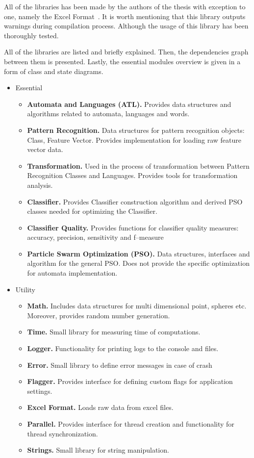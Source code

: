 \documentclass{mini}
\begin{document}
All of the libraries has been made by the authors of the thesis with exception to one, namely the Excel Format~\cite{excel_format}. It is worth mentioning that this library outputs warnings during compilation process. Although the usage of this library has been thoroughly tested.

All of the libraries are listed and briefly explained. Then, the dependencies graph between them is presented. Lastly, the essential modules overview is given in a form of class and state diagrams.

\begin{itemize}
    \item Essential
    \begin{itemize}
        \item {\bf Automata and Languages (ATL).} Provides data structures and algorithms related to automata, languages and words.
        \item {\bf Pattern Recognition.} Data structures for pattern recognition objects: Class, Feature Vector. Provides implementation for loading raw feature vector data.
        \item {\bf Transformation.} Used in the process of transformation between Pattern Recognition Classes and Languages. Provides tools for transformation analysis.
        \item {\bf Classifier.} Provides Classifier construction algorithm and derived PSO classes needed for optimizing the Classifier.
        \item {\bf Classifier Quality.} Provides functions for classifier quality measures: accuracy, precision, sensitivity and f--measure
        \item {\bf Particle Swarm Optimization (PSO).} Data structures, interfaces and algorithm for the general PSO. Does not provide the specific optimization for automata implementation.
    \end{itemize}

    \item Utility
    \begin{itemize}
        \item {\bf Math.} Includes data structures for multi dimensional point, spheres etc. Moreover, provides random number generation.
        \item {\bf Time.} Small library for measuring time of computations.
        \item {\bf Logger.} Functionality for printing logs to the console and files.
        \item {\bf Error.} Small library to define error messages in case of crash
        \item {\bf Flagger.} Provides interface for defining custom flags for application settings.
        \item {\bf Excel Format.} Loads raw data from excel files.
        \item {\bf Parallel.} Provides interface for thread creation and functionality for thread synchronization.
        \item {\bf Strings.} Small library for string manipulation.
    \end{itemize}
\end{itemize}
\end{document}
